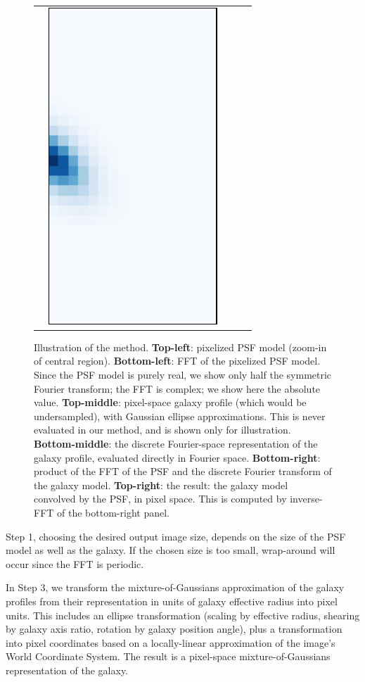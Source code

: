\documentclass[11pt,preprint]{aastex}
\newcommand{\trick}{method}
\begin{document}
\begin{figure}
\begin{center}
\begin{tabular}{@{}c@{}c@{}c@{}c@{}c@{}}
      &
      \multicolumn{1}{r}{%
        \includegraphics[height=0.22\textwidth]{psf-03}}
    \end{tabular}
  \end{center}
  \caption{\label{fig:example}%
    Illustration of the \trick.
    \textbf{Top-left}: pixelized PSF model (zoom-in of central region).
    \textbf{Bottom-left}: FFT of the pixelized PSF model.  Since the PSF model is
    purely real, we show only half the symmetric Fourier transform; the FFT is
    complex; we show here the absolute value.
    \textbf{Top-middle}: pixel-space galaxy profile (which would be
    undersampled), with Gaussian ellipse approximations.  This is
    never evaluated in our method, and is shown only for illustration.
    \textbf{Bottom-middle}: the discrete Fourier-space representation of the
    galaxy profile, evaluated directly in Fourier space.
    \textbf{Bottom-right}: product of the FFT of the PSF and the
    discrete Fourier transform of the galaxy model.
    \textbf{Top-right}: the result: the galaxy model convolved by the
    PSF, in pixel space.  This is computed by inverse-FFT of the
    bottom-right panel.
  }
\end{figure}



Step 1, choosing the desired output image size, depends on the size of
the PSF model as well as the galaxy.  If the chosen size is too small,
wrap-around will occur since the FFT is periodic.

In Step 3, we transform the mixture-of-Gaussians approximation of the
galaxy profiles from their representation in units of galaxy effective
radius into pixel units.  This includes an ellipse transformation
(scaling by effective radius, shearing by galaxy axis ratio, rotation
by galaxy position angle), plus a transformation into pixel
coordinates based on a locally-linear approximation of the image's
World Coordinate System.
The result is a pixel-space mixture-of-Gaussians representation of the
galaxy.
\end{document}
